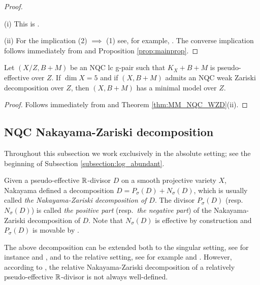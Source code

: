 	\begin{proof}~
		
		\medskip
		
		\noindent (i) This is \cite[Theorem B]{LT22a}.
		
		\medskip
		
		\noindent (ii) For the implication (2) $ \implies $ (1) see, for example, \cite[Corollary 3.10]{Tsak21}. The converse implication follows immediately from \cite[Theorem 4.4(i)]{LT22a} and Proposition \ref{prop:mainprop}.
	\end{proof}
	
	\begin{cor}\label{cor:maincor_II}
		Let $ (X/Z,B+M) $ be an NQC lc g-pair such that $ K_X+B+M$ is pseudo-effective over $ Z $. If $ \dim X = 5$ and if $ (X,B+M) $ admits an NQC weak Zariski decomposition over $ Z $, then $ (X,B+M) $ has a minimal model over $Z$.
	\end{cor}
	
	\begin{proof}
		Follows immediately from \cite[Theorem 5-1-15]{KMM87} and Theorem \ref{thm:MM_NQC_WZD}(ii).
	\end{proof}
	
	
	\subsection{NQC Nakayama-Zariski decomposition}
	\label{subsection:NQC_NZD}
	
	Throughout this subsection we work exclusively in the absolute setting; see the beginning of Subsection \ref{subsection:log_abundant}.
	
	Given a pseudo-effective $\mathbb{R}$-divisor $D$ on a smooth projective variety $X$, Nakayama \cite{Nak04} defined a decomposition $ D = P_\sigma (D) + N_\sigma (D) $, which is usually called \emph{the Naka\-yama-Zariski decomposition of $D$}. The divisor $ P_\sigma(D) $ (resp.\ $ N_\sigma(D) $) is called \emph{the positive part} (resp.\ \emph{the negative part}) of the Nakayama-Zariski decomposition of $D$. Note that $ N_\sigma(D) $ is effective by construction and $ P_\sigma(D) $ is movable by \cite[Lemma III.1.8 and Proposition III.1.14(1)]{Nak04}.
	
	The above decomposition can be extended both to the singular setting, see for instance \cite[Section 4]{BH14b} and \cite[Subsection 2.1]{Hash20d}, and to the relative setting, see for example \cite[Subsection III.4]{Nak04} and \cite[Section 3]{LX22a}. However, according to \cite{Les16}, the relative Nakayama-Zariski decomposition of a relatively pseudo-effective $ \mathbb{R} $-divisor is not always well-defined.
	
